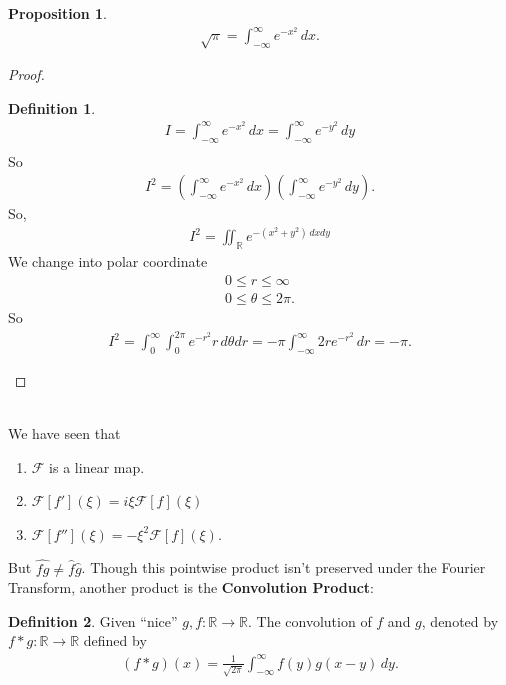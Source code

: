 \documentclass{book}
\theoremstyle{definition}
\newtheorem{defn}{Definition}[section]
\newtheorem{prop}{Proposition}[section]
\newcommand{\F}{\mathcal{F}}
\begin{document}
\begin{prop}
	\begin{align*}
	\sqrt{\pi} = \int^\infty_{-\infty}e^{-x^2}\,dx.
	\end{align*}
	
	\begin{proof}
		\begin{defn}
			\begin{align*}
			I = \int^\infty_{-\infty}e^{-x^2}\,dx = \int^\infty_{-\infty}e^{-y^2}\,dy\\
			\end{align*}
			So
			\begin{align*}
			I^2 = \left(\int^\infty_{-\infty}e^{-x^2}\,dx\right)\left(\int^\infty_{-\infty}e^{-y^2}\,dy\right).
			\end{align*}
			So,
			\begin{align*}
			I^2 = \iint_{\mathbb{R}}e^{-(x^2+y^2)\,dxdy}
			\end{align*}
			We change into polar coordinate
			\begin{align*}
			0 \leq r \leq \infty\\
			0 \leq \theta \leq 2\pi.
			\end{align*}
			So
			\begin{align*}
			I^2 = \int^\infty_0 \int^{2\pi}_0 e^{-r^2}r\,d\theta dr = -\pi\int^\infty_{-\infty}2re^{-r^2}\,dr = -\pi.
			\end{align*}
		\end{defn}
	\end{proof}
	
\end{prop}


$\,$\\


We have seen that 
\begin{enumerate}
	\item $\F$ is a linear map.
	\item $\F[f'](\xi) = i\xi \F[f](\xi)$
	\item $\F[f''](\xi) = -\xi^2 \F[f](\xi)$.
\end{enumerate}

But $\widehat{fg} \neq \hat{f}\hat{g}$. Though this pointwise product isn't preserved under the Fourier Transform, another product is the \textbf{Convolution Product}:

\begin{defn}
	Given ``nice'' $g,f : \mathbb{R} \to \mathbb{R}$. The convolution of $f$ and $g$, denoted by $f\ast g : \mathbb{R} \to \mathbb{R}$ defined by
	\begin{align*}
	(f\ast g)(x) = \frac{1}{\sqrt{2\pi}}\int^\infty_{-\infty}f(y)g(x-y)\,dy.
	\end{align*}
\end{defn}
\end{document}
